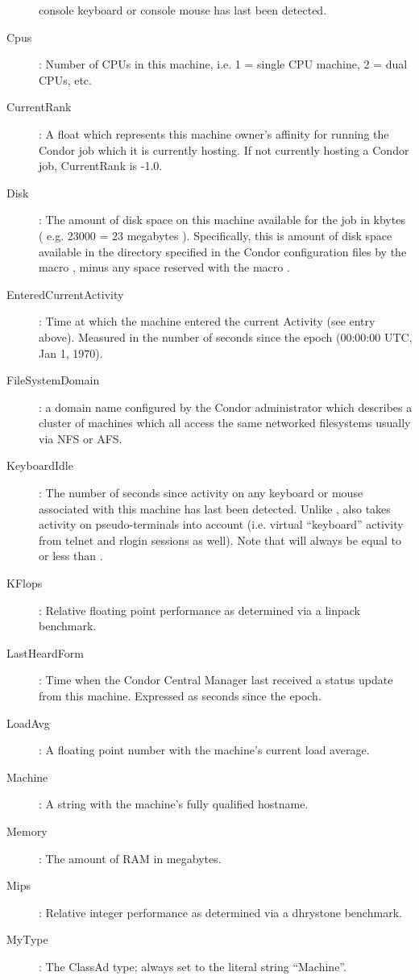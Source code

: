 \begin{description}
console keyboard or console mouse has last been detected.
%
\item[Cpus] : Number of CPUs in this machine, i.e. 1 = single CPU machine, 2 = dual
CPUs, etc.
%
\item[CurrentRank] : A float which represents this machine owner's affinity
for running the Condor job which it is currently hosting.  If not
currently hosting a Condor job, CurrentRank is -1.0.
%
\item[Disk] : The amount of disk space on this machine available for the
job in kbytes ( e.g. 23000 = 23 megabytes ).  Specifically, this is
amount of disk space available in the directory specified in the Condor 
configuration files by the macro , minus any space reserved
with the macro .
%
\item[EnteredCurrentActivity] : Time at which the machine entered the 
current Activity (see  entry above).  Measured in the
number of seconds since the epoch (00:00:00 UTC, Jan 1, 1970).
%
\item[FileSystemDomain] : a domain name configured by the Condor 
administrator which describes a cluster of machines which all access 
the same networked filesystems usually via NFS or AFS.  
%
\item[KeyboardIdle] : The number of seconds since activity on any
keyboard or mouse associated with this machine has last been detected.
Unlike ,  also takes activity 
on pseudo-terminals into
account (i.e. virtual ``keyboard'' activity from telnet and rlogin
sessions as well).  Note that  will always be equal to or
less than .
%
\item[KFlops] : Relative floating point performance as determined via a
linpack benchmark.
%
\item[LastHeardForm] : Time when the Condor Central Manager last
received a status update from this machine.  Expressed as seconds since
the epoch.
%
\item[LoadAvg] : A floating point number with the machine's current load
average.
%
\item[Machine] : A string with the machine's fully qualified hostname.
%
\item[Memory] : The amount of RAM in megabytes.
%
\item[Mips] : Relative integer performance as determined via a dhrystone
benchmark.
%
\item[MyType] : The ClassAd type; always set to the literal string ``Machine''.

\end{description}
